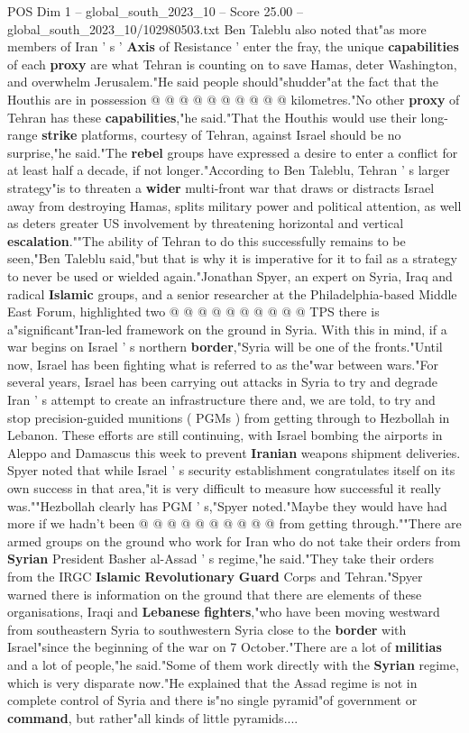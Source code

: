 \begin{textsample}{POS Dim 1 – global\_south\_2023\_10 – Score 25.00 – global\_south\_2023\_10/102980503.txt}
Ben Taleblu also noted that"as more members of Iran ' s ' \textbf{Axis} of Resistance ' enter the fray, the unique \textbf{capabilities} of each \textbf{proxy} are what Tehran is counting on to save Hamas, deter Washington, and overwhelm Jerusalem."He said people should"shudder"at the fact that the Houthis are in possession @ @ @ @ @ @ @ @ @ @ kilometres."No other \textbf{proxy} of Tehran has these \textbf{capabilities},"he said."That the Houthis would use their long-range \textbf{strike} platforms, courtesy of Tehran, against Israel should be no surprise,"he said."The \textbf{rebel} groups have expressed a desire to enter a conflict for at least half a decade, if not longer."According to Ben Taleblu, Tehran ' s larger strategy"is to threaten a \textbf{wider} multi-front war that draws or distracts Israel away from destroying Hamas, splits military power and political attention, as well as deters greater US involvement by threatening horizontal and vertical \textbf{escalation}.""The ability of Tehran to do this successfully remains to be seen,"Ben Taleblu said,"but that is why it is imperative for it to fail as a strategy to never be used or wielded again."Jonathan Spyer, an expert on Syria, Iraq and radical \textbf{Islamic} groups, and a senior researcher at the Philadelphia-based Middle East Forum, highlighted two @ @ @ @ @ @ @ @ @ @ TPS there is a"significant"Iran-led framework on the ground in Syria.
With this in mind, if a war begins on Israel ' s northern \textbf{border},"Syria will be one of the fronts."Until now, Israel has been fighting what is referred to as the"war between wars."For several years, Israel has been carrying out attacks in Syria to try and degrade Iran ' s attempt to create an infrastructure there and, we are told, to try and stop precision-guided munitions ( PGMs ) from getting through to Hezbollah in Lebanon.
These efforts are still continuing, with Israel bombing the airports in Aleppo and Damascus this week to prevent \textbf{Iranian} weapons shipment deliveries.
Spyer noted that while Israel ' s security establishment congratulates itself on its own success in that area,"it is very difficult to measure how successful it really was.""Hezbollah clearly has PGM ' s,"Spyer noted."Maybe they would have had more if we hadn't been @ @ @ @ @ @ @ @ @ @ from getting through.""There are armed groups on the ground who work for Iran who do not take their orders from \textbf{Syrian} President Basher al-Assad ' s regime,"he said."They take their orders from the IRGC \textbf{Islamic} \textbf{Revolutionary} \textbf{Guard} Corps and Tehran."Spyer warned there is information on the ground that there are elements of these organisations, Iraqi and \textbf{Lebanese} \textbf{fighters},"who have been moving westward from southeastern Syria to southwestern Syria close to the \textbf{border} with Israel"since the beginning of the war on 7 October."There are a lot of \textbf{militias} and a lot of people,"he said."Some of them work directly with the \textbf{Syrian} regime, which is very disparate now."He explained that the Assad regime is not in complete control of Syria and there is"no single pyramid"of government or \textbf{command}, but rather"all kinds of little pyramids....

\end{textsample}
